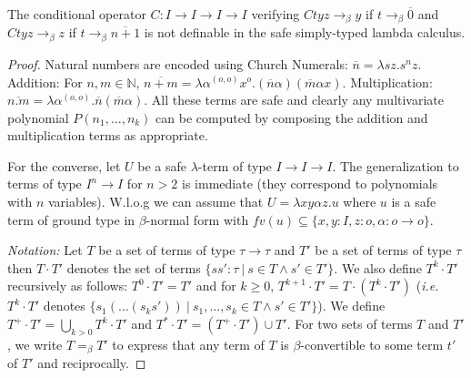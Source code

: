 \documentclass{llncs}
\newcommand{\encode}[1]{\overline{#1}} \newcommand\dps{\displaystyle}
\newcommand\union{\cup}
\newcommand\Union{\bigcup}
\newcommand\nat{\mathbb{N}}
\begin{document}
\begin{corollary}
The conditional operator $C:I\rightarrow I\rightarrow I \rightarrow I$ verifying  $C t y z \rightarrow_\beta y$  if $t \rightarrow_\beta \encode{0}$ and $C t y z \rightarrow_\beta z$ if $t \rightarrow_\beta \encode{n+1}$ is not definable in the safe simply-typed lambda calculus.
\end{corollary}
\begin{proof}
  Natural numbers are encoded using Church Numerals: $\encode{n} =
  \lambda s z. s^n z$.  Addition: For $n,m \in \nat$, $\encode{n+m} =
  \lambda \alpha^{(o,o)} x^o . (\encode{n} \alpha) (\encode{m} \alpha
  x)$. Multiplication: $\encode{n . m} = \lambda \alpha^{(o,o)}
  . \encode{n} (\encode{m} \alpha)$.  All these terms are safe and
  clearly any multivariate polynomial $P(n_1, \ldots, n_k)$ can be
  computed by composing the addition and multiplication terms as
  appropriate.

For the converse, let $U$ be a safe $\lambda$-term of type
$I\rightarrow I\rightarrow I$.  The generalization to terms of type
$I^n \rightarrow I$ for $n>2$ is immediate (they correspond to
polynomials with $n$ variables). W.l.o.g we can
assume that $U = \lambda x y \alpha z. u$ where $u$ is a safe term of
ground type in $\beta$-normal form with $fv(u) \subseteq \{ x, y : I,
z :o, \alpha : o\rightarrow o \}$.

\emph{Notation:} Let $T$ be a set of terms of type $\tau \rightarrow \tau$ and $T'$ be a set of terms of type $\tau$ then $T \cdot T'$ denotes the set of terms $\{ s s' : \tau \ | \ s \in T \wedge s' \in T' \}$. We also define
$T^k \cdot T'$ recursively as follows:  $T^0 \cdot T' = T'$ and
for $k\geq 0$, $T^{k+1} \cdot T' = T \cdot (T^k \cdot T')$ ({\it i.e.}~$T^k \cdot T'$ denotes $\{ s_1( \ldots (s_k s'))  \ | \ s_1, \ldots, s_k \in T \wedge s' \in T' \}$). We define $T^+\cdot T' = \Union_{k > 0} T^k \cdot T'$ and
$T^*\cdot T' = (T^+\cdot T') \union T'$.
For two sets of terms $T$ and $T'$, we write $T =_\beta T'$ to express that any term of $T$ is $\beta$-convertible to some term $t'$ of $T'$ and reciprocally.


\end{proof}
\end{document}

